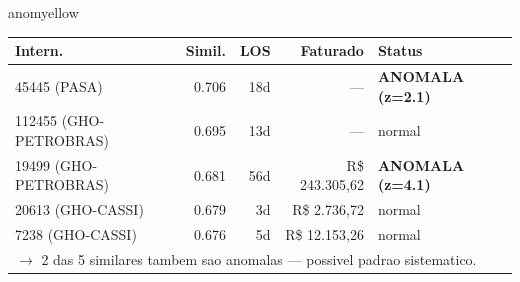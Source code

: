 \documentclass[a4paper,10pt]{article}
\begin{document}
\begin{anomalycard}[Internacao 165893 | GHO-PETROBRAS | MODERADO (z=2.42)]{anomyellow}
\begin{tabular}{l r r r l}\toprule\textbf{Intern.} & \textbf{Simil.} & \textbf{LOS} & \textbf{Faturado} & \textbf{Status} \\\midrule
45445 (PASA) & 0.706 & 18d & --- & \textcolor{anomred}{\textbf{ANOMALA (z=2.1)}} \\
112455 (GHO-PETROBRAS) & 0.695 & 13d & --- & \textcolor{jcubeblue}{normal} \\
19499 (GHO-PETROBRAS) & 0.681 & 56d & R\$ 243.305,62 & \textcolor{anomred}{\textbf{ANOMALA (z=4.1)}} \\
20613 (GHO-CASSI) & 0.679 & 3d & R\$ 2.736,72 & \textcolor{jcubeblue}{normal} \\
7238 (GHO-CASSI) & 0.676 & 5d & R\$ 12.153,26 & \textcolor{jcubeblue}{normal} \\
\multicolumn{5}{l}{\textcolor{anomred}{\small $\rightarrow$ 2 das 5 similares tambem sao anomalas --- possivel padrao sistematico.}} \\
\bottomrule\end{tabular}



\end{anomalycard}

\newpage
\end{document}
